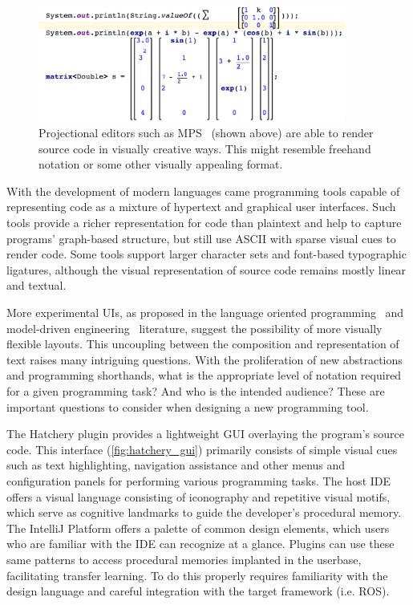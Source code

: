 \documentclass[12pt,initial,twoside,maitrise]{dms}
\numberwithin{equation}{section}
\numberwithin{table}{chapter}
\numberwithin{figure}{chapter}
\begin{document}
\begin{figure}
    \centering
    \includegraphics[width=0.90\textwidth]{../figures/mps_screenshot.png}
    \caption{Projectional editors such as MPS~\citep{voelter2010language, pech2013jetbrains} (shown above) are able to render source code in visually creative ways. This might resemble freehand notation or some other visually appealing format.}
    \label{fig:mps_screenshot}
\end{figure}

With the development of modern languages came programming tools capable of representing code as a mixture of hypertext and graphical user interfaces. Such tools provide a richer representation for code than plaintext and help to capture programs' graph-based structure, but still use ASCII with sparse visual cues to render code. Some tools support larger character sets and font-based typographic ligatures, although the visual representation of source code remains mostly linear and textual.

More experimental UIs, as proposed in the language oriented programming~\citep{dmitriev2004language} and model-driven engineering~\citep{famelis2015mummint} literature, suggest the possibility of more visually flexible layouts. This uncoupling between the composition and representation of text raises many intriguing questions. With the proliferation of new abstractions and programming shorthands, what is the appropriate level of notation required for a given programming task? And who is the intended audience? These are important questions to consider when designing a new programming tool.

The Hatchery plugin provides a lightweight GUI overlaying the program's source code. This interface (\autoref{fig:hatchery_gui}) primarily consists of simple visual cues such as text highlighting, navigation assistance and other menus and configuration panels for performing various programming tasks. The host IDE offers a visual language consisting of iconography and repetitive visual motifs, which serve as cognitive landmarks to guide the developer's procedural memory. The IntelliJ Platform offers a palette of common design elements, which users who are familiar with the IDE can recognize at a glance. Plugins can use these same patterns to access procedural memories implanted in the userbase, facilitating transfer learning. To do this properly requires familiarity with the design language and careful integration with the target framework (i.e. ROS).
\end{document}
